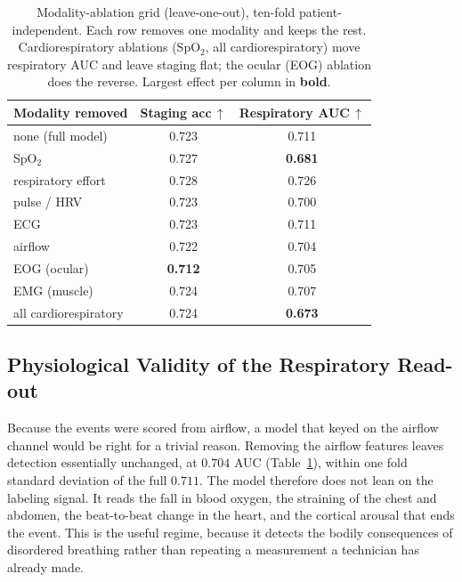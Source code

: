 \documentclass[journal]{IEEEtran}
\newcommand{\mmAuc}{0.711}
\newcommand{\noflowAuc}{0.704}
\begin{document}
\begin{table}[t]
\caption{Modality-ablation grid (leave-one-out), ten-fold patient-independent. Each row removes
one modality and keeps the rest. Cardiorespiratory ablations (SpO$_2$, all cardiorespiratory)
move respiratory AUC and leave staging flat; the ocular (EOG) ablation does the reverse. Largest
effect per column in \textbf{bold}.}
\label{tab:ablate}
\centering
\setlength{\tabcolsep}{8pt}
\begin{tabular}{lcc}
\toprule
Modality removed & Staging acc\,$\uparrow$ & Respiratory AUC\,$\uparrow$ \\
\midrule
none (full model)        & 0.723 & 0.711 \\
SpO$_2$                  & 0.727 & \textbf{0.681} \\
respiratory effort       & 0.728 & 0.726 \\
pulse / HRV              & 0.723 & 0.700 \\
ECG                      & 0.723 & 0.711 \\
airflow                  & 0.722 & 0.704 \\
EOG (ocular)             & \textbf{0.712} & 0.705 \\
EMG (muscle)             & 0.724 & 0.707 \\
all cardiorespiratory    & 0.724 & \textbf{0.673} \\
\bottomrule
\end{tabular}
\end{table}

\subsection{Physiological Validity of the Respiratory Read-out}
\label{sec:noflow}
Because the events were scored from airflow, a model that keyed on the airflow channel would
be right for a trivial reason. Removing the airflow features leaves detection essentially
unchanged, at $\noflowAuc$ AUC (Table~\ref{tab:ablate}), within one fold standard deviation of
the full $\mmAuc$. The model therefore does not lean on the labeling signal. It reads the fall
in blood oxygen, the straining of the chest and abdomen, the beat-to-beat change in the heart,
and the cortical arousal that ends the event. This is the useful regime, because it detects the
bodily consequences of disordered breathing rather than repeating a measurement a technician
has already made.
\end{document}
